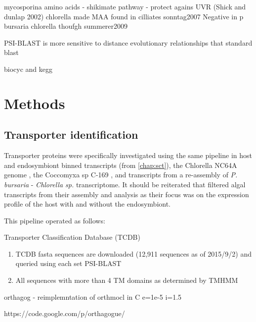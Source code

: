 mycosporina amino acids - shikimate pathway - protect agains UVR \citep{Sommaruga2009} (Shick and dunlap 2002)
chlorella made MAA found in cilliates sonntag2007 
Negative in p bursaria chlorella thoufgh summerer2009


PSI-BLAST is more sensitive to distance evolutionary relationships that standard blast

biocyc and kegg 

\section{Methods}

\subsection{Transporter identification}

Transporter proteins were specifically investigated using the same pipeline in
host and endosymbiont binned transcripts (from \ref{chap:sct}), the Chlorella NC64A
genome \citep{Blanc2010}, the Coccomyxa sp C-169 \citep{Blanc2012}, 
and transcripts from a re-assembly of \citet{Kodama2014c} \textit{P. bursaria} 
- \textit{Chlorella sp.} transcriptome.  It should be reiterated that
\citet{Kodama2014c} filtered algal transcripts from their assembly and analysis
as their focus was on the expression profile of the host with and without 
the endosymbiont.

This pipeline operated as follows:

Transporter Classification Database (TCDB) \citep{Saier2006,Saier2009,Saier2014}



\begin{enumerate} 
    \item TCDB fasta sequences are downloaded (12,911 sequences as of 2015/9/2) and queried using each set PSI-BLAST 
    \item All sequences with more than 4 TM domains as determined by TMHMM


\end{enumerate}

orthagog - reimplemntation of orthmocl in C
e=1e-5 
i=1.5


https://code.google.com/p/orthagogue/


